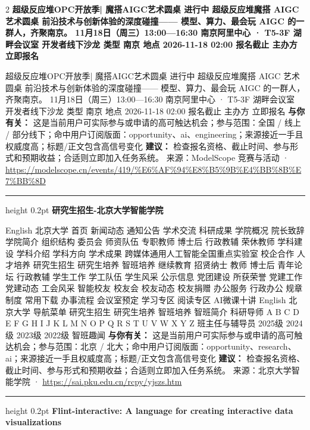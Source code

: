\documentclass[10.5pt]{ctexart}
\begin{document}
\begin{multicols}{2}
{\large\bfseries 超级反应堆OPC开放季| 魔搭AIGC艺术圆桌 进行中 超级反应堆魔搭 AIGC 艺术圆桌 前沿技术与创新体验的深度碰撞—— 模型、算力、最会玩 AIGC 的一群人，齐聚南京。 11月18日（周三）13:00—16:30 南京阿里中心 · T5-3F 湖畔会议室 开发者线下沙龙 类型 南京 地点 2026-11-18 02:00 报名截止 主办方 立即报名}\par
超级反应堆OPC开放季| 魔搭AIGC艺术圆桌 进行中 超级反应堆魔搭 AIGC 艺术圆桌 前沿技术与创新体验的深度碰撞—— 模型、算力、最会玩 AIGC 的一群人，齐聚南京。 11月18日（周三）13:00—16:30 南京阿里中心 · T5-3F 湖畔会议室 开发者线下沙龙 类型 南京 地点 2026-11-18 02:00 报名截止 主办方 立即报名
\textbf{与你有关：} 这是当前用户可实际参与或申请的高可触达机会；参与范围：全国 / 线上 / 部分线下；命中用户订阅版面：opportunity、ai、engineering；来源接近一手且权威度高；标题/正文包含高信号变化
\textbf{建议：} 检查报名资格、截止时间、参与形式和预期收益；合适则立即加入任务系统。
{\footnotesize\color{ormuted} 来源：ModelScope 竞赛与活动 · \url{https://modelscope.cn/events/419/%E6%AF%94%E8%B5%9B%E4%BB%8B%E7%BB%8D}}
\vspace{2mm}
\hrule height 0.2pt
\vspace{2mm}
{\large\bfseries 研究生招生-北京大学智能学院}\par
English 北京大学 首页 新闻动态 通知公告 学术交流 科研成果 学院概况 院长致辞 学院简介 组织结构 委员会 师资队伍 专职教师 博士后 行政教辅 荣休教师 学科建设 学科介绍 学科方向 学术成果 跨媒体通用人工智能全国重点实验室 校企合作 人才培养 研究生招生 研究生培养 智班培养 继续教育 招贤纳士 教师 博士后 青年论坛 行政教辅 学生工作 学工队伍 学生风采 公示信息 党团建设 所获荣誉 党建工作 党建动态 工会风采 智能校友 校友会 校友动态 校友捐赠 办公服务 行政办公 规章制度 常用下载 办事流程 会议室预定 学习专区 阅读专区 AI微课十讲 English 北京大学 导航菜单 研究生招生 研究生培养 智班培养 智班简介 科研导师 A B C D E F G H I J K L M N O P Q R S T U V W X Y Z 班主任与辅导员 2025级 2024级 2023级 2022级 智班趣闻
\textbf{与你有关：} 这是当前用户可实际参与或申请的高可触达机会；参与范围：北京 / 北大；命中用户订阅版面：opportunity、research、ai；来源接近一手且权威度高；标题/正文包含高信号变化
\textbf{建议：} 检查报名资格、截止时间、参与形式和预期收益；合适则立即加入任务系统。
{\footnotesize\color{ormuted} 来源：北京大学智能学院 · \url{https://sai.pku.edu.cn/rcpy/yjszs.htm}}
\vspace{2mm}
\hrule height 0.2pt
\vspace{2mm}
{\large\bfseries Flint-interactive: A language for creating interactive data visualizations}\par

\end{multicols}
\end{document}
